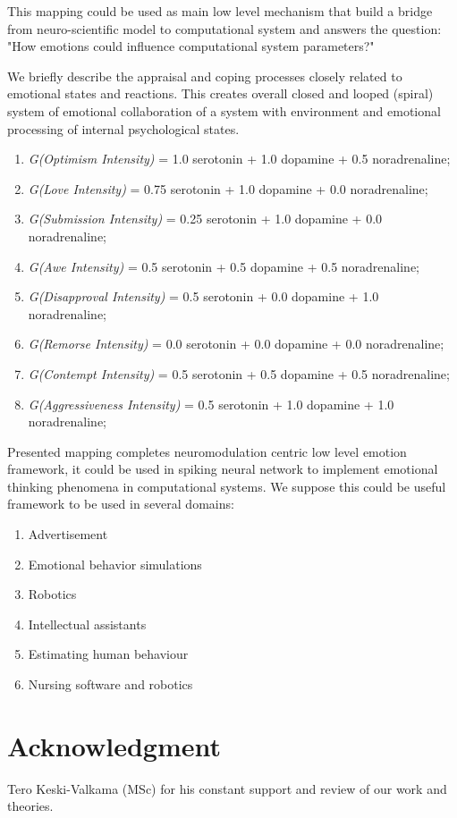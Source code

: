 This mapping could be used as main low level mechanism that build a bridge from neuro-scientific model to computational system and answers the question: "How emotions could influence computational system parameters?"

We briefly describe the appraisal and coping processes closely related to emotional states and reactions. This creates overall closed and looped (spiral) system of emotional collaboration of a system with environment and emotional processing of internal psychological states.



\begin{enumerate}
 \item  \emph{G(Optimism Intensity)} = 1.0 serotonin  + 1.0 dopamine + 0.5 noradrenaline;
 \item  \emph{G(Love Intensity)} = 0.75 serotonin + 1.0 dopamine + 0.0 noradrenaline;
 \item  \emph{G(Submission Intensity)} = 0.25 serotonin + 1.0 dopamine + 0.0 noradrenaline;
 \item  \emph{G(Awe Intensity)} = 0.5 serotonin + 0.5 dopamine + 0.5 noradrenaline;
 \item  \emph{G(Disapproval Intensity)} = 0.5 serotonin + 0.0 dopamine + 1.0 noradrenaline;
 \item  \emph{G(Remorse Intensity)} = 0.0 serotonin + 0.0 dopamine + 0.0 noradrenaline;
 \item  \emph{G(Contempt Intensity)} = 0.5 serotonin + 0.5 dopamine + 0.5 noradrenaline;
 \item  \emph{G(Aggressiveness Intensity)} = 0.5 serotonin + 1.0 dopamine + 1.0 noradrenaline;
\end{enumerate}

Presented mapping completes neuromodulation centric low level emotion framework, it could be used in spiking neural network to implement emotional thinking phenomena in computational systems. We suppose this could be useful framework to be used in several domains:

\begin{enumerate}
 \item  Advertisement
 \item  Emotional behavior simulations
 \item  Robotics
 \item  Intellectual assistants
 \item  Estimating human behaviour
 \item  Nursing software and robotics
\end{enumerate}

\section{Acknowledgment}

Tero Keski-Valkama (MSc) for his constant support and review of our work and theories.
